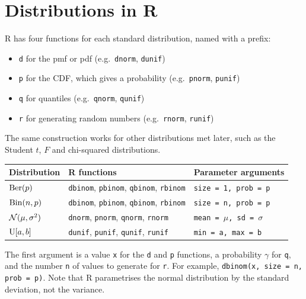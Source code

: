 \section{Distributions in R}\label{sec:distributions-in-r}

R has four functions for each standard distribution, named with a prefix:
\begin{itemize}
  \item \texttt{d} for the pmf or pdf (e.g.\ \texttt{dnorm}, \texttt{dunif})
  \item \texttt{p} for the CDF, which gives a probability (e.g.\ \texttt{pnorm}, \texttt{punif})
  \item \texttt{q} for quantiles (e.g.\ \texttt{qnorm}, \texttt{qunif})
  \item \texttt{r} for generating random numbers (e.g.\ \texttt{rnorm}, \texttt{runif})
\end{itemize}
The same construction works for other distributions met later, such as the Student $t$, $F$ and chi-squared distributions.

\begin{center}
\begin{tabular}{@{}lll@{}}
\toprule
Distribution & R functions & Parameter arguments \\
\midrule
$\mathrm{Ber}(p)$ & \texttt{dbinom}, \texttt{pbinom}, \texttt{qbinom}, \texttt{rbinom} & \texttt{size = 1, prob = p} \\
$\mathrm{Bin}(n, p)$ & \texttt{dbinom}, \texttt{pbinom}, \texttt{qbinom}, \texttt{rbinom} & \texttt{size = n, prob = p} \\
$\mathcal{N}(\mu, \sigma^2)$ & \texttt{dnorm}, \texttt{pnorm}, \texttt{qnorm}, \texttt{rnorm} & \texttt{mean = $\mu$, sd = $\sigma$} \\
$\mathrm{U}[a, b]$ & \texttt{dunif}, \texttt{punif}, \texttt{qunif}, \texttt{runif} & \texttt{min = a, max = b} \\
\bottomrule
\end{tabular}
\end{center}
The first argument is a value \texttt{x} for the \texttt{d} and \texttt{p} functions, a probability $\gamma$ for \texttt{q}, and the number \texttt{n} of values to generate for \texttt{r}. For example, \texttt{dbinom(x, size = n, prob = p)}. Note that R parametrises the normal distribution by the standard deviation, not the variance.

